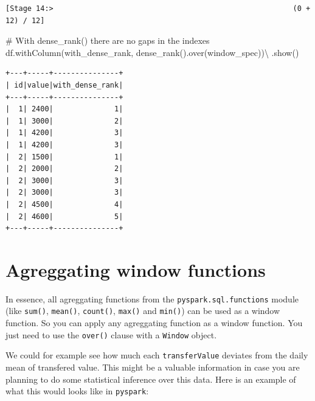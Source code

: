 \documentclass[
  11pt,
  letterpaper,
  DIV=11,
  numbers=noendperiod]{scrreprt}
\newenvironment{Shaded}{\begin{snugshade}}{\end{snugshade}}
\newcommand{\CommentTok}[1]{\textcolor[rgb]{0.37,0.37,0.37}{#1}}
\newcommand{\NormalTok}[1]{\textcolor[rgb]{0.00,0.23,0.31}{#1}}
\newcommand{\OperatorTok}[1]{\textcolor[rgb]{0.37,0.37,0.37}{#1}}
\newcommand{\StringTok}[1]{\textcolor[rgb]{0.13,0.47,0.30}{#1}}
\begin{document}
\begin{verbatim}
[Stage 14:>                                                       (0 + 12) / 12]
\end{verbatim}

\begin{Shaded}
\begin{Highlighting}[]
\CommentTok{\# With dense\_rank() there are no gaps in the indexes}
\NormalTok{df.withColumn(}\StringTok{\textquotesingle{}with\_dense\_rank\textquotesingle{}}\NormalTok{, dense\_rank().over(window\_spec))}\OperatorTok{\textbackslash{}}
\NormalTok{    .show()}
\end{Highlighting}
\end{Shaded}

\begin{verbatim}
+---+-----+---------------+
| id|value|with_dense_rank|
+---+-----+---------------+
|  1| 2400|              1|
|  1| 3000|              2|
|  1| 4200|              3|
|  1| 4200|              3|
|  2| 1500|              1|
|  2| 2000|              2|
|  2| 3000|              3|
|  2| 3000|              3|
|  2| 4500|              4|
|  2| 4600|              5|
+---+-----+---------------+
\end{verbatim}

\hypertarget{agreggating-window-functions}{%
\section{Agreggating window
functions}\label{agreggating-window-functions}}

In essence, all agreggating functions from the
\texttt{pyspark.sql.functions} module (like \texttt{sum()},
\texttt{mean()}, \texttt{count()}, \texttt{max()} and \texttt{min()})
can be used as a window function. So you can apply any agreggating
function as a window function. You just need to use the \texttt{over()}
clause with a \texttt{Window} object.

We could for example see how much each \texttt{transferValue} deviates
from the daily mean of transfered value. This might be a valuable
information in case you are planning to do some statistical inference
over this data. Here is an example of what this would looks like in
\texttt{pyspark}:
\end{document}

